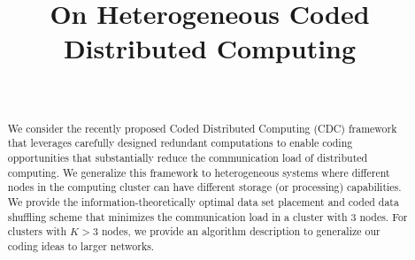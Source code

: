 \documentclass[conference]{IEEEtran}
\begin{document}
\onecolumn
\newtheorem{theorem}{Theorem}
\newtheorem{corollary}{Corollary}
\newtheorem{conjecture}{Conjecture}
\newtheorem{definition}{Definition}
\newtheorem{lemma}{Lemma}
\newtheorem{algorithm}{Algorithm}
\newtheorem{remark}{Remark}
\newtheorem{idea}{Idea}
\newtheorem{observation}{Observation}

\newcommand*{\QEDB}{\hfill\ensuremath{\square}}%
\newcommand{\define}{\stackrel{\triangle}{=}}

\pagestyle{empty}

\def\sDoF{\overline{\mbox{\normalfont \scriptsize DoF}}}

\def\QED{\mbox{\rule[0pt]{1.5ex}{1.5ex}}}
\def\proof{\noindent{\it Proof: }}
\date{}

\title{On Heterogeneous Coded Distributed Computing}
\author{\\
}%
\maketitle

\thispagestyle{empty}
\begin{abstract}
We consider the recently proposed Coded Distributed Computing (CDC) framework \cite{LMA_all, Avestimehr_CDC, li2016fundamental} that leverages carefully designed redundant computations to enable coding opportunities that substantially reduce the communication load of distributed computing. We generalize this framework to heterogeneous systems where different nodes in the computing cluster can have different storage (or processing) capabilities. We provide the information-theoretically optimal data set placement and coded data shuffling scheme that minimizes the communication load in a cluster with 3 nodes. For clusters with $K>3$ nodes, we provide an algorithm description to generalize our coding ideas to larger networks.

\end{abstract}
\end{document}
